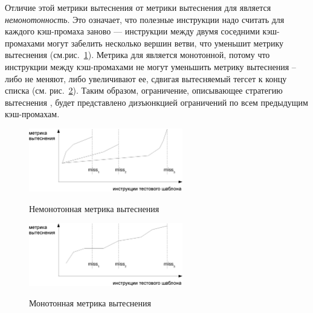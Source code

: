 Отличие этой метрики вытеснения от метрики вытеснения для \LRU
является \emph{немонотонность}. Это означает, что полезные
инструкции надо считать для каждого кэш-промаха заново ---
инструкции между двумя соседними кэш-промахами могут забелить
несколько вершин ветви, что уменьшит метрику вытеснения
(см.рис.~\ref{nonmonotonic}). Метрика для \LRU является монотонной,
потому что инструкции между кэш-промахами не могут уменьшить метрику
вытеснения -- либо не меняют, либо увеличивают ее, сдвигая
вытесняемый тегсет к концу списка \LRU (см. рис.~\ref{monotonic}).
Таким образом, ограничение, описывающее стратегию вытеснения
\PseudoLRU, будет представлено дизъюнкцией ограничений по всем
предыдущим кэш-промахам.

\begin{figure}[h] \center
  \includegraphics[width=0.6\textwidth]{2.theor/nonmonotonic}\\
  \caption{Немонотонная метрика вытеснения}\label{nonmonotonic}
\end{figure}

\begin{figure}[h] \center
  \includegraphics[width=0.6\textwidth]{2.theor/monotonic}\\
  \caption{Монотонная метрика вытеснения}\label{monotonic}
\end{figure}

